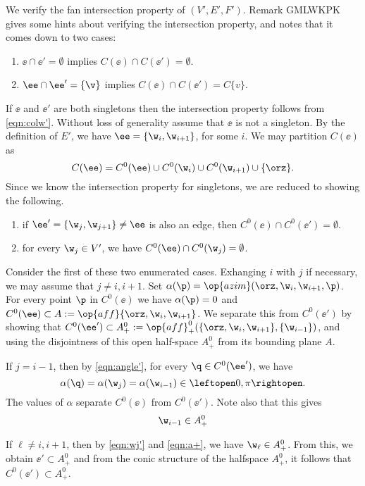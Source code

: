 We verify the fan intersection property of $(V',E',F')$.  Remark GMLWKPK gives
some hints about verifying the intersection property, and notes that it comes
down to two cases:
\begin{enumerate}
\item $\ee\cap \ee' = \emptyset$ implies $C(\ee)\cap C(\ee') = \emptyset$.
\item $\ee\cap\ee' = \{\v\}$ implies $C(\ee)\cap C(\ee') = C\{v\}$.
\end{enumerate}
If $\ee$ and $\ee'$ are both singletons then the intersection property
follows from \eqref{eqn:colw'}.  Without loss of generality assume that $\ee$ is
not a singleton.  By the definition of $E'$, we have 
 $\ee=\{\w_i,\w_{i+1} \}$, for some $i$.  We may partition $C(\ee)$ as
\[
C(\ee) = C^0(\ee) \cup C^0(\w_i) \cup C^0(\w_{i+1})\cup \{\orz\}.
\]
Since we know the intersection property for singletons, we are reduced to showing
the following.
\begin{enumerate}
\item if $\ee'=\{\w_j,\w_{j+1}\}\ne\ee$ is also an edge, then  $C^0(\ee)\cap C^0(\ee')=\emptyset$.
\item for every $\w_j\in V'$, we have $C^0(\ee) \cap C^0(\w_j)=\emptyset$.
\end{enumerate}

Consider the first of these two enumerated 
cases.  Exhanging $i$ with $j$ if necessary,
we may assume that $j\ne i,i+1$.  
Set $\alpha(\p)=\op{azim}(\orz,\w_i,\w_{i+1},\p)$.  For every point
$\p$ in $C^0(\ee)$ we have
$\alpha(\p)=0$ and
$C^0(\ee)\subset A:= \op{aff}\{\orz,\w_i,\w_{i+1}\}$.
We separate this from $C^0(\ee')$ by showing that
$C^0(\ee')\subset A_+^0:= \op{aff}_+^0(\{\orz,\w_i,\w_{i+1}\},\{\w_{i-1}\})$,
and using the disjointness of this open half-space $A_+^0$ from its bounding
plane $A$.

 If $j=i-1$, then by \eqref{eqn:angle'}, for every $\q\in C^0(\ee')$, 
we have 
\[
\alpha(\q)=\alpha(\w_j) = \alpha(\w_{i-1}) \in\leftopen 0,\pi\rightopen.
\]
The values of $\alpha$ separate $C^0(\ee)$ from $C^0(\ee')$.  Note also
that this gives 
\begin{equation}\label{eqn:a+}
\w_{i-1}\in A_+^0
\end{equation}

If $\ell\ne i,i+1$, then by \eqref{eqn:wj'} and \eqref{eqn:a+}, we have
$\w_\ell\in A_+^0$.  From this, we obtain $\ee'\subset A_+^0$ and from
the conic structure of the halfspace $A_+^0$, it follows that $C^0(\ee')\subset A_+^0$.


